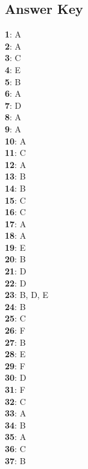 \documentclass{exam}
\begin{document}
\begin{questions}
\section*{Answer Key}
    \textbf{1}: A \\
    \textbf{2}: A \\
    \textbf{3}: C \\
    \textbf{4}: E \\
    \textbf{5}: B \\
    \textbf{6}: A \\
    \textbf{7}: D \\
    \textbf{8}: A \\
    \textbf{9}: A \\
    \textbf{10}: A \\
    \textbf{11}: C \\
    \textbf{12}: A \\
    \textbf{13}: B \\
    \textbf{14}: B \\
    \textbf{15}: C \\
    \textbf{16}: C \\
    \textbf{17}: A \\
    \textbf{18}: A \\
    \textbf{19}: E \\
    \textbf{20}: B \\
    \textbf{21}: D \\
    \textbf{22}: D \\
    \textbf{23}: B, D, E \\
    \textbf{24}: B \\
    \textbf{25}: C \\
    \textbf{26}: F \\
    \textbf{27}: B \\
    \textbf{28}: E \\
    \textbf{29}: F \\
    \textbf{30}: D \\
    \textbf{31}: F \\
    \textbf{32}: C \\
    \textbf{33}: A \\
    \textbf{34}: B \\
    \textbf{35}: A \\
    \textbf{36}: C \\
    \textbf{37}: B \\
    
\end{questions}
\end{document}

